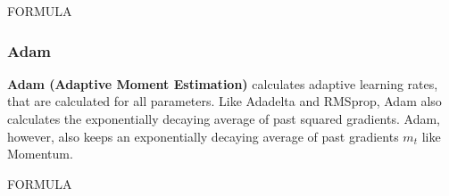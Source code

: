 FORMULA

\subsubsection{Adam}
\textbf{Adam (Adaptive Moment Estimation)} calculates adaptive learning rates, that are calculated for all parameters. Like Adadelta and RMSprop, Adam also calculates the exponentially decaying average of past squared gradients. Adam, however, also keeps an exponentially decaying average of past gradients $m_{t}$ like Momentum. \cite{Kingma2015Adam:Optimization}

FORMULA


